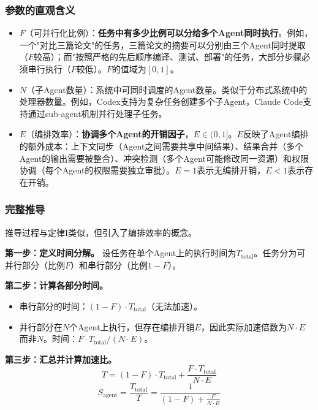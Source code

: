 \subsubsection{参数的直观含义}

\begin{itemize}[nosep]
\item $F$（可并行化比例）：\textbf{任务中有多少比例可以分给多个Agent同时执行}。例如，一个"对比三篇论文"的任务，三篇论文的摘要可以分别由三个Agent同时提取（$F$较高）；而"按照严格的先后顺序编译、测试、部署"的任务，大部分步骤必须串行执行（$F$较低）。$F$的值域为$[0, 1]$。

\item $N$（子Agent数量）：系统中可同时调度的Agent数量。类似于分布式系统中的处理器数量。例如，Codex支持为复杂任务创建多个子Agent\cite{openai_codex_subagents_2026}，Claude Code支持通过sub-agent机制并行处理子任务\cite{anthropic_claudecode_subagents_2026}。

\item $E$（编排效率）：\textbf{协调多个Agent的开销因子}，$E \in (0, 1]$。$E$反映了Agent编排的额外成本：上下文同步（Agent之间需要共享中间结果）、结果合并（多个Agent的输出需要被整合）、冲突检测（多个Agent可能修改同一资源）和权限协调（每个Agent的权限需要独立审批）。$E = 1$表示无编排开销，$E < 1$表示存在开销。
\end{itemize}

\subsubsection{完整推导}

推导过程与定律I类似，但引入了编排效率的概念。

\textbf{第一步：定义时间分解。}
设任务在单个Agent上的执行时间为$T_{\mathrm{total}}$。任务分为可并行部分（比例$F$）和串行部分（比例$1-F$）。

\textbf{第二步：计算各部分时间。}
\begin{itemize}[nosep]
\item 串行部分的时间：$(1-F) \cdot T_{\mathrm{total}}$（无法加速）。
\item 并行部分在$N$个Agent上执行，但存在编排开销$E$，因此实际加速倍数为$N \cdot E$而非$N$。时间：$F \cdot T_{\mathrm{total}} / (N \cdot E)$。
\end{itemize}

\textbf{第三步：汇总并计算加速比。}
\begin{equation}
T = (1-F) \cdot T_{\mathrm{total}} + \frac{F \cdot T_{\mathrm{total}}}{N \cdot E}
\end{equation}
\begin{equation}
S_{\mathrm{agent}} = \frac{T_{\mathrm{total}}}{T} = \frac{1}{(1-F) + \frac{F}{N \cdot E}}
\end{equation}

